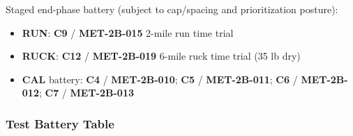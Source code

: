 \documentclass[10pt]{article}
\begin{document}
Staged end-phase battery (subject to cap/spacing and prioritization posture):

\begin{itemize}
\item \textbf{RUN}: \textbf{C9} / \textbf{MET-2B-015} 2-mile run time trial
\item \textbf{RUCK}: \textbf{C12} / \textbf{MET-2B-019} 6-mile ruck time trial (35 lb dry)
\item \textbf{CAL} battery: \textbf{C4} / \textbf{MET-2B-010}; \textbf{C5} / \textbf{MET-2B-011}; \textbf{C6} / \textbf{MET-2B-012}; \textbf{C7} / \textbf{MET-2B-013}
\end{itemize}

\subsubsection*{Test Battery Table}
\end{document}
